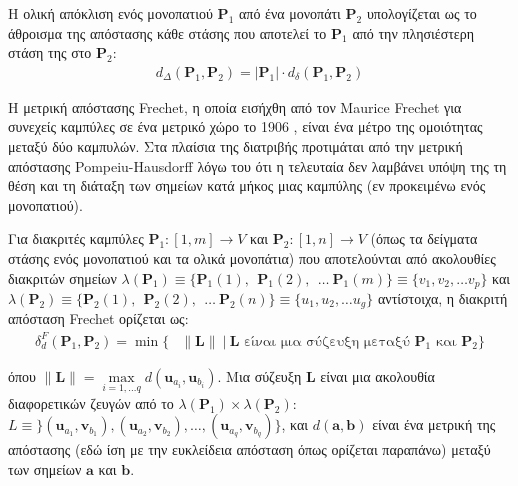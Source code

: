 \begin{bw_box}
\begin{definition}
Η ολική απόκλιση ενός μονοπατιού $\bm{P}_1$ από ένα μονοπάτι $\bm{P}_2$
υπολογίζεται ως το άθροισμα της απόστασης κάθε στάσης που αποτελεί το $\bm{P}_1$
από την πλησιέστερη στάση της στο $\bm{P}_2$:
\begin{align}
  d_{\Delta}(\bm{P}_1,\bm{P}_2) = |\bm{P}_1| \cdot d_{\delta}(\bm{P}_1,\bm{P}_2)
\end{align}
\end{definition}
\end{bw_box}


Η μετρική απόστασης Frechet, η οποία εισήχθη από τον Maurice Frechet για
συνεχείς καμπύλες σε ένα μετρικό χώρο το 1906 \cite{Frechet1906}, είναι ένα
μέτρο της ομοιότητας μεταξύ δύο καμπυλών. Στα πλαίσια της διατριβής προτιμάται
από την μετρική απόστασης Pompeiu-Hausdorff \cite{RockafellarR} λόγω του ότι η
τελευταία δεν λαμβάνει υπόψη της τη θέση και τη διάταξη των σημείων κατά μήκος
μιας καμπύλης (εν προκειμένω ενός μονοπατιού).


\begin{bw_box}
\begin{definition}
Για διακριτές καμπύλες
$\bm{P}_1 : [1, m] \rightarrow V$ και $\bm{P}_2 : [1, n] \rightarrow V$
(όπως τα δείγματα στάσης ενός μονοπατιού και τα ολικά μονοπάτια) που
αποτελούνται από ακολουθίες διακριτών σημείων
$\lambda(\bm{P}_1) \equiv \{\bm{P}_1(1),\ \ \bm{P}_1(2),\ \ \dots\ \bm{P}_1(m)\} \equiv \{v_1, v_2, \dots v_p\}$ και
$\lambda(\bm{P}_2) \equiv \{\bm{P}_2(1),\ \ \bm{P}_2(2),\ \ \dots\ \bm{P}_2(n)\} \equiv \{u_1, u_2, \dots u_g\}$
αντίστοιχα, η διακριτή απόσταση Frechet ορίζεται ως:
\begin{align}
  \delta_{d}^F(\bm{P}_1,\bm{P}_2) = \min\{ &\|\bm{L}\| \ | \ \bm{L} \text{ είναι μια σύζευξη μεταξύ } \bm{P}_1 \text{ και } \bm{P}_2 \}
\end{align}

όπου $\|\bm{L}\| = \max\limits_{i=1,\dots q} d(\bm{u}_{a_i}, \bm{u}_{b_i})$.
Μια σύζευξη $\bm{L}$ είναι μια ακολουθία διαφορετικών ζευγών από το
$\lambda(\bm{P}_1) \times \lambda(\bm{P}_2)$: $L \equiv \}(\bm{u}_{a_1},
\bm{v}_{b_1}), (\bm{u}_{a_2}, \bm{v}_{b_2}), \dots , (\bm{u}_{a_q},
\bm{v}_{b_q})\}$, και $d(\bm{a},\bm{b})$ είναι ένα μετρική της απόστασης (εδώ
ίση με την ευκλείδεια απόσταση όπως ορίζεται παραπάνω) μεταξύ των σημείων
$\bm{a}$ και $\bm{b}$.

\end{definition}
\end{bw_box}

